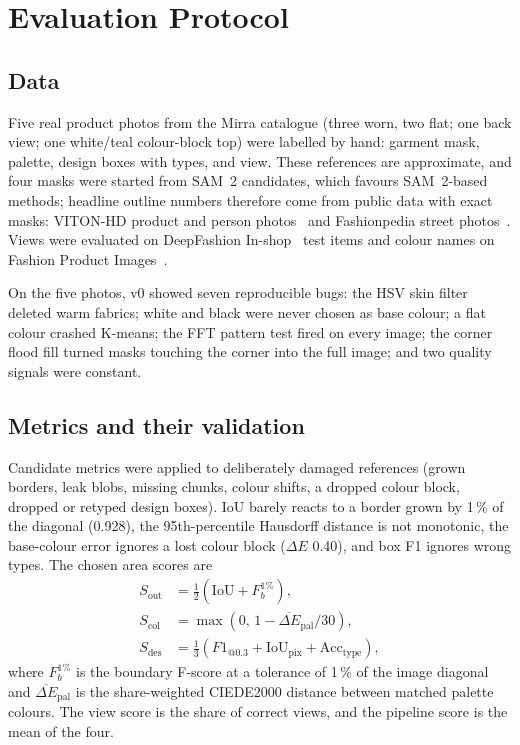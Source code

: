 \documentclass[conference]{IEEEtran}
\begin{document}
\section{Evaluation Protocol}
\label{sec:baseline}
\subsection{Data}
Five real product photos from the Mirra catalogue (three worn, two flat; one back view; one white/teal colour-block top) were labelled by hand: garment mask, palette, design boxes with types, and view. These references are approximate, and four masks were started from SAM~2 candidates, which favours SAM~2-based methods; headline outline numbers therefore come from public data with exact masks: VITON-HD product and person photos~\cite{choi2021vitonhd} and Fashionpedia street photos~\cite{jia2020fashionpedia}. Views were evaluated on DeepFashion In-shop~\cite{liu2016deepfashion} test items and colour names on Fashion Product Images~\cite{aggarwal2019fpi}.

On the five photos, v0 showed seven reproducible bugs: the HSV skin filter deleted warm fabrics; white and black were never chosen as base colour; a flat colour crashed K-means; the FFT pattern test fired on every image; the corner flood fill turned masks touching the corner into the full image; and two quality signals were constant.

\subsection{Metrics and their validation}
Candidate metrics were applied to deliberately damaged references (grown borders, leak blobs, missing chunks, colour shifts, a dropped colour block, dropped or retyped design boxes). IoU barely reacts to a border grown by 1\,\% of the diagonal (0.928), the 95th-percentile Hausdorff distance is not monotonic, the base-colour error ignores a lost colour block ($\Delta E$ 0.40), and box F1 ignores wrong types. The chosen area scores are
\begin{align}
S_{\text{out}} &= \tfrac{1}{2}\left(\text{IoU} + F_{b}^{1\%}\right),\\
S_{\text{col}} &= \max\!\left(0,\, 1 - \overline{\Delta E}_{\text{pal}}/30\right),\\
S_{\text{des}} &= \tfrac{1}{3}\left(F1_{@0.3} + \text{IoU}_{\text{pix}} + \text{Acc}_{\text{type}}\right),
\end{align}
where $F_b^{1\%}$ is the boundary F-score at a tolerance of 1\,\% of the image diagonal and $\overline{\Delta E}_{\text{pal}}$ is the share-weighted CIEDE2000 distance between matched palette colours. The view score is the share of correct views, and the pipeline score is the mean of the four.
\end{document}
